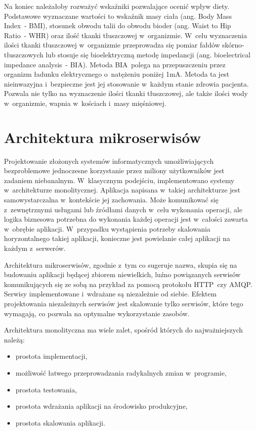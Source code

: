 \par
Na koniec należałoby rozważyć wskaźniki pozwalające ocenić wpływ diety.
Podstawowe wyznaczane wartości to wskaźnik masy ciała (ang. Body Mass Index~- BMI), stosunek obwodu talii do obwodu bioder (ang. Waist to Hip Ratio~- WHR) oraz ilość tkanki tłuszczowej w~organizmie.
W~celu wyznaczenia ilości tkanki tłuszczowej w~organizmie przeprowadza się pomiar fałdów skórno-tłuszczowych lub stosuje się bioelektryczną metodę impedancji (ang. bioelectrical impedance analysis~- BIA).
Metoda BIA~polega na przepuszczeniu przez organizm ładunku elektrycznego o~natężeniu poniżej 1mA.
Metoda ta jest nieinwazyjna i~bezpieczne jest jej stosowanie w~każdym stanie zdrowia pacjenta.
Pozwala nie tylko na wyznaczenie ilości tkanki tłuszczowej, ale także ilości wody w~organizmie, wapnia w~kościach i~masy mięśniowej\cite{book:dietetyka-zywienie-zdrowego-i-chorego-czlowieka}.

\section{Architektura mikroserwisów}\label{sec:usefull-technologies}

Projektowanie złożonych systemów informatycznych umożliwiających bezproblemowe jednoczesne korzystanie przez miliony użytkowników jest zadaniem niebanalnym.
W~klasycznym podejściu, implementowano systemy w~architekturze monolitycznej.
Aplikacja napisana w~takiej architekturze jest samowystarczalna w~kontekście jej zachowania.
Może komunikować się z~zewnętrznymi usługami lub źródłami danych w~celu wykonania operacji,
ale logika biznesowa potrzebna do wykonania każdej operacji jest w~całości zawarta w~obrębie aplikacji.
W~przypadku wystąpienia potrzeby skalowania horyzontalnego takiej aplikacji,
konieczne jest powielanie całej aplikacji na każdym z~serwerów\cite{url:microsoft-web-architectures}.

\par
Architektura mikroserwisów, zgodnie z~tym co sugeruje nazwa, skupia się na budowaniu aplikacji będącej zbiorem niewielkich,
luźno powiązanych serwisów komunikujących się ze sobą na przykład za pomocą protokołu HTTP~czy AMQP.
Serwisy implementowane i~wdrażane są niezależnie od siebie\cite{book:dot-net-microservices}.
Efektem projektowania niezależnych serwisów jest skalowanie tylko serwisów, które tego wymagają,
co pozwala na optymalne wykorzystanie zasobów\cite{book:mastering-microservices-with-java9}.

\par
Architektura monolityczna ma wiele zalet\cite{book:microservices-patterns}, spośród których do najważniejszych należą:
\begin{itemize}
    \item prostota implementacji,
    \item możliwość łatwego przeprowadzania radykalnych zmian w~programie,
    \item prostota testowania,
    \item prostota wdrażania aplikacji na środowisko produkcyjne,
    \item prostota skalowania aplikacji.
\end{itemize}

